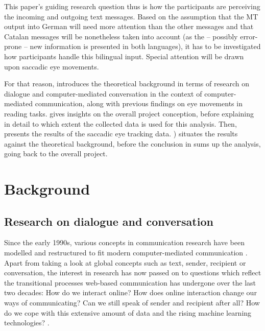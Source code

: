 \documentclass[output=paper,colorlinks,citecolor=brown]{langscibook}
\begin{document}
This paper's guiding research question thus is how the participants are perceiving the incoming and outgoing text messages. Based on the assumption that the MT output into German will need more attention than the other messages and that Catalan messages will be nonetheless taken into account (as the -- possibly error-prone -- new information is presented in both languages), it has to be investigated how participants handle this bilingual input. Special attention will be drawn upon saccadic eye movements.

For that reason,  introduces the theoretical background in terms of research on dialogue and computer-mediated conversation in the context of computer-mediated communication, along with previous findings on eye movements in reading tasks.  gives insights on the overall project conception, before explaining in detail to which extent the collected data is used for this analysis. Then,  presents the results of the saccadic eye tracking data. ) situates the results against the theoretical background, before the conclusion in  sums up the analysis, going back to the overall project.


\section{Background}
\label{sec:background}



\subsection{Research on dialogue and conversation}
\label{subsec:research}


    Since the early 1990s, various concepts in communication research have been modelled and restructured to fit modern computer-mediated communication \citep[7]{fiser_investigating_2017}. Apart from taking a look at global concepts such as text, sender, recipient or conversation, the interest in research has now passed on to questions which reflect the transitional processes web-based communication has undergone over the last two decades: How do we interact online? How does online interaction change our ways of communicating? Can we still speak of sender and recipient after all? How do we cope with this extensive amount of data and the rising machine learning technologies? \citep[cf.][]{beiswenger_sprachhandlungskoordination_2007}.
    
\end{document}
